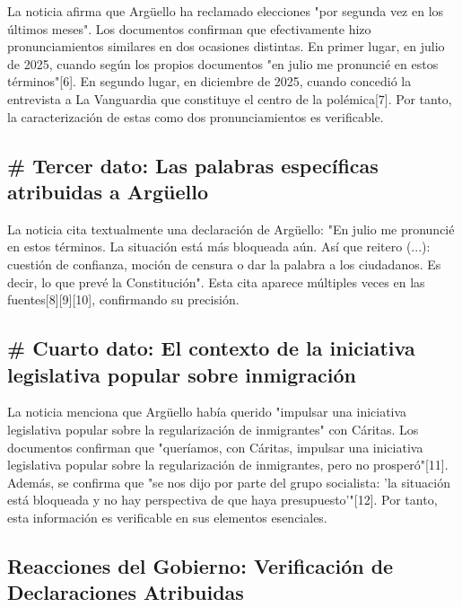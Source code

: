 \documentclass[10pt,a4paper]{article}
\begin{document}
 La noticia afirma que Arg\"{u}ello ha reclamado elecciones "por segunda vez en los \'{u}ltimos meses". Los documentos confirman que efectivamente hizo pronunciamientos similares en dos ocasiones distintas. En primer lugar, en julio de 2025, cuando seg\'{u}n los propios documentos "en julio me pronunci\'{e} en estos t\'{e}rminos"[6]. En segundo lugar, en diciembre de 2025, cuando concedi\'{o} la entrevista a La Vanguardia que constituye el centro de la pol\'{e}mica[7]. Por tanto, la caracterizaci\'{o}n de estas como dos pronunciamientos es verificable. 

\subsection*{\# Tercer dato: Las palabras espec\'{i}ficas atribuidas a Arg\"{u}ello}

 La noticia cita textualmente una declaraci\'{o}n de Arg\"{u}ello: "En julio me pronunci\'{e} en estos t\'{e}rminos. La situaci\'{o}n est\'{a} m\'{a}s bloqueada a\'{u}n. As\'{i} que reitero (...): cuesti\'{o}n de confianza, moci\'{o}n de censura o dar la palabra a los ciudadanos. Es decir, lo que prev\'{e} la Constituci\'{o}n". Esta cita aparece m\'{u}ltiples veces en las fuentes[8][9][10], confirmando su precisi\'{o}n. 

\subsection*{\# Cuarto dato: El contexto de la iniciativa legislativa popular sobre inmigraci\'{o}n}

 La noticia menciona que Arg\"{u}ello hab\'{i}a querido "impulsar una iniciativa legislativa popular sobre la regularizaci\'{o}n de inmigrantes" con C\'{a}ritas. Los documentos confirman que "quer\'{i}amos, con C\'{a}ritas, impulsar una iniciativa legislativa popular sobre la regularizaci\'{o}n de inmigrantes, pero no prosper\'{o}"[11]. Adem\'{a}s, se confirma que "se nos dijo por parte del grupo socialista: 'la situaci\'{o}n est\'{a} bloqueada y no hay perspectiva de que haya presupuesto'"[12]. Por tanto, esta informaci\'{o}n es verificable en sus elementos esenciales. 

\subsection*{Reacciones del Gobierno: Verificaci\'{o}n de Declaraciones Atribuidas}
\end{document}
